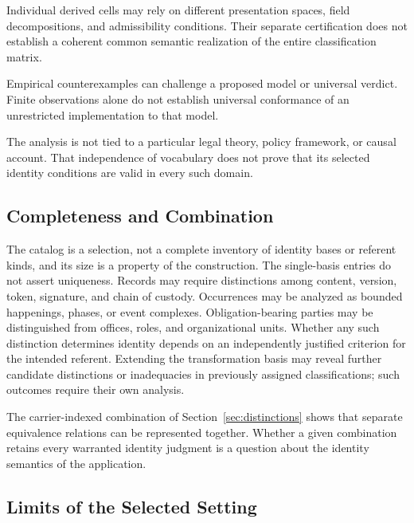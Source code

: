 Individual derived cells may rely on different presentation
spaces, field decompositions, and admissibility conditions.
Their separate certification does not establish a coherent
common semantic realization of the entire classification matrix.

Empirical counterexamples can challenge a proposed model or
universal verdict.
Finite observations alone do not establish universal conformance
of an unrestricted implementation to that model.

The analysis is not tied to a particular legal theory, policy framework,
or causal account.
That independence of vocabulary does not prove that
its selected identity conditions are valid in every such domain.

\subsection{Completeness and Combination}
\label{subsec:limits_completeness}

The catalog is a selection, not a complete inventory of identity bases
or referent kinds, and its size is a property of the construction.
The single-basis entries do not assert uniqueness.
Records may require distinctions among content, version, token,
signature, and chain of custody.
Occurrences may be analyzed as bounded happenings, phases, or event
complexes.
Obligation-bearing parties may be distinguished from offices, roles,
and organizational units.
Whether any such distinction determines identity depends on
an independently justified criterion for the intended referent.
Extending the transformation basis may reveal further candidate
distinctions or inadequacies in previously assigned classifications;
such outcomes require their own analysis.

The carrier-indexed combination of Section~\ref{sec:distinctions}
shows that separate equivalence relations can be represented together.
Whether a given combination retains every warranted identity judgment
is a question about the identity semantics of the application.

\subsection{Limits of the Selected Setting}
\label{subsec:limits_excluded_systems}

